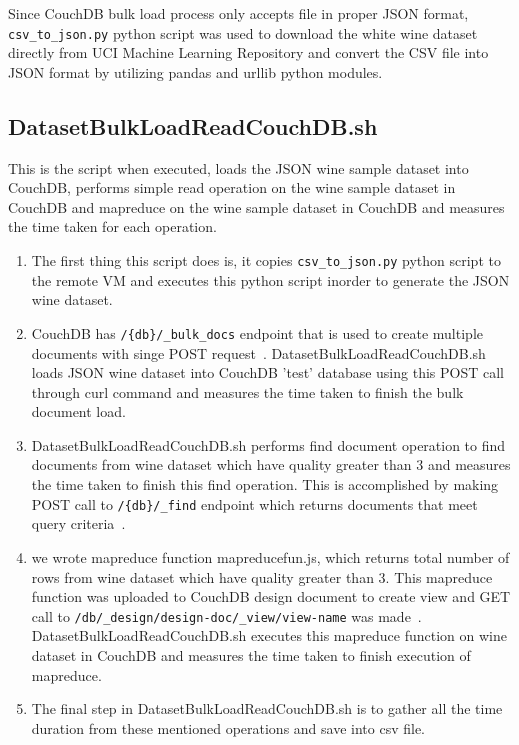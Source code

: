 Since CouchDB bulk load process only accepts file in proper JSON
format, \verb|csv_to_json.py| python script was used to
download the white wine dataset directly from UCI Machine Learning
Repository and convert the CSV file into JSON format by utilizing
pandas and urllib python modules.

\subsection{DatasetBulkLoadReadCouchDB.sh}
This is the script when executed, loads the JSON wine sample dataset
into CouchDB, performs simple read operation on the wine sample
dataset in CouchDB and mapreduce on the wine sample
dataset in CouchDB and measures the time taken for each operation.

\begin{enumerate}
  \item The first thing this script does is, it copies \verb|csv_to_json.py|
python script to the remote VM and executes this python script inorder
to generate the JSON wine dataset.
  \item CouchDB has \verb|/{db}/_bulk_docs|
endpoint that is used to create multiple documents with singe POST
request~\cite{www-CouchdbBulkApi}. DatasetBulkLoadReadCouchDB.sh loads JSON wine dataset
into CouchDB  'test' database using this POST call through curl command
and measures the time taken to finish the bulk document load.

  \item DatasetBulkLoadReadCouchDB.sh performs find document operation to find documents
from wine dataset which have quality greater than 3 and measures the time taken to finish this find
operation. This is accomplished by making POST call to
\verb|/{db}/_find| endpoint which returns documents that meet query criteria~\cite{www-CouchdbFind}.

  \item we wrote mapreduce function mapreducefun.js, which returns
    total number of rows from wine dataset which have quality greater than 3. This mapreduce
    function was uploaded to CouchDB design document to create view and GET call to
    \verb|/db/_design/design-doc/_view/view-name| was
    made~\cite{www-CouchdbView}. DatasetBulkLoadReadCouchDB.sh
    executes this mapreduce function on wine dataset in CouchDB and
    measures the time taken to finish execution of mapreduce.
  \item The final step in DatasetBulkLoadReadCouchDB.sh is to gather
    all the time duration from these mentioned operations and save
    into csv file.

\end{enumerate}

